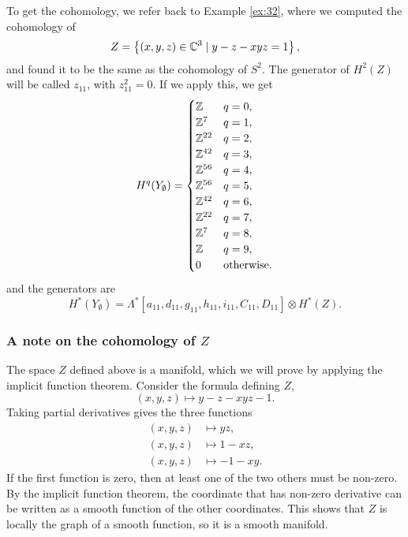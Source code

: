 To get the cohomology, we refer back to Example \ref{ex:32}, where we
computed the cohomology of
\[ Z=\left\{ (x,y,z)\in\mathbb{C}^3 \mid y-z-xyz = 1 \right\}, \]
and found it to be the same as the cohomology of $S^2$. The generator
of $H^2(Z)$ will be called $z_{11}$, with $z_{11}^2 = 0$. If we apply
this, we get
\[ H^q(Y_{\emptyset}) =
\begin{cases}
  \mathbb{Z} & q = 0, \\
  \mathbb{Z}^7 & q = 1, \\
    \mathbb{Z}^{22} & q = 2, \\
    \mathbb{Z}^{42} & q = 3, \\
    \mathbb{Z}^{56} & q = 4, \\
    \mathbb{Z}^{56} & q = 5, \\
    \mathbb{Z}^{42} & q = 6, \\
    \mathbb{Z}^{22} & q = 7, \\
    \mathbb{Z}^{7} & q = 8, \\
    \mathbb{Z} & q = 9, \\
    0 & \text{otherwise}.
  \end{cases} \] 
and the generators are
\[ H^*(Y_{\emptyset}) =
\Lambda^*[a_{11},d_{11},g_{11},h_{11},i_{11},C_{11},D_{11}]
\otimes H^*(Z). \]

\subsubsection{A note on the cohomology of $Z$}

The space $Z$ defined above is a manifold, which we will prove by
applying the implicit function theorem. Consider the formula defining
$Z$,
\[ (x,y,z) \mapsto y-z-xyz-1. \]
Taking partial derivatives gives the three functions
\begin{align*}
  (x,y,z) &\mapsto yz, \\
  (x,y,z) &\mapsto 1-xz, \\
  (x,y,z) &\mapsto -1-xy.
\end{align*}
If the first function is zero, then at least one of the two others
must be non-zero. By the implicit function theorem, the coordinate
that has non-zero derivative can be written as a smooth function of
the other coordinates. This shows that $Z$ is locally the graph of a
smooth function, so it is a smooth manifold.

